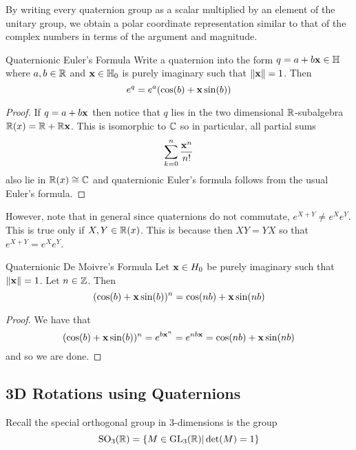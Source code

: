 \documentclass[a4paper]{article}
\begin{document}
By writing every quaternion group as a scalar multiplied by an element of the unitary group, we obtain a polar coordinate representation similar to that of the complex numbers in terms of the argument and magnitude. 

\begin{prp}{Quaternionic Euler's Formula}{} Write a quaternion into the form $q=a+b\vb{x}\in\mathbb{H}$ where $a,b\in\mathbb{R}$ and $\vb{x}\in\mathbb{H}_0$ is purely imaginary such that $\|\vb{x}\|=1$. Then $$e^q=e^a(\cos(b)+\vb{x}\sin(b))$$ \tcbline
\begin{proof}
If $q=a+b\vb{x}$ then notice that $q$ lies in the two dimensional $\mathbb{R}$-subalgebra $\mathbb{R}(x)=\mathbb{R}+\mathbb{R}\vb{x}$. This is isomorphic to $\mathbb{C}$ so in particular, all partial sums $$\sum_{k=0}^n\frac{\vb{x}^n}{n!}$$ also lie in $\mathbb{R}(x)\cong\mathbb{C}$ and quaternionic Euler's formula follows from the usual Euler's formula. 
\end{proof}
\end{prp}

However, note that in general since quaternions do not commutate, $e^{X+Y}\neq e^Xe^Y$. This is true only if $X,Y\in\mathbb{R}(x)$. This is because then $XY=YX$ so that $e^{X+Y}=e^Xe^Y$. 

\begin{prp}{Quaternionic De Moivre's Formula}{} Let $\vb{x}\in H_0$ be purely imaginary such that $\|\vb{x}\|=1$. Let $n\in\mathbb{Z}$. Then $$(\cos(b)+\vb{x}\sin(b))^n=\cos(nb)+\vb{x}\sin(nb)$$ \tcbline
\begin{proof}
We have that $$(\cos(b)+\vb{x}\sin(b))^n=e^{{b\vb{x}}^n}=e^{nb\vb{x}}=\cos(nb)+\vb{x}\sin(nb)$$ and so we are done. 
\end{proof}
\end{prp}

\subsection{3D Rotations using Quaternions}
Recall the special orthogonal group in $3$-dimensions is the group $$\text{SO}_3(\mathbb{R})=\{M\in\text{GL}_3(\mathbb{R})|\det(M)=1\}$$
\end{document}
